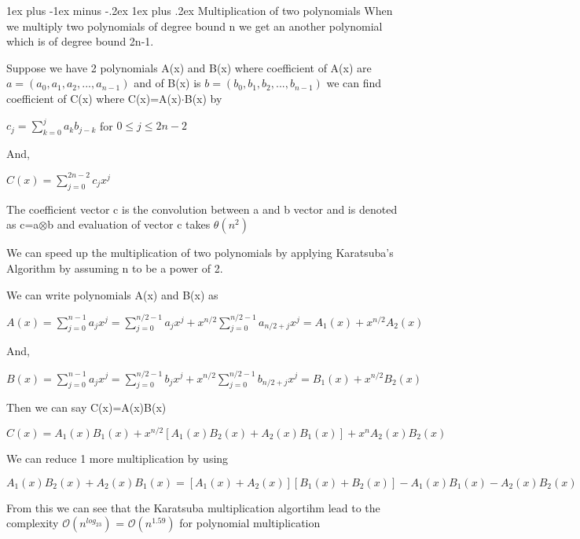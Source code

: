 \documentclass[11pt]{article}
\makeatletter
\renewcommand{\subsubsection}{\@startsection{subsubsection}{3}{0mm}%
                                     {1ex plus -1ex minus -.2ex}%
                                     {1ex plus .2ex}%
                                     {\normalfont\normalsize\bfseries}}
\newcommand{\Oh}[1]{{\mathcal O}\left({#1}\right)}
\makeatother
\begin{document}
\subsubsection{Multiplication of two polynomials}
When we multiply two polynomials of degree bound n we get an another polynomial which is of degree bound 2n-1.

Suppose we have 2 polynomials A(x) and B(x) where coefficient of A(x) are $a=(a_0,a_1,a_2,...,a_{n-1})$ and of B(x) is $b=(b_0,b_1,b_2,...,b_{n-1})$ we can find coefficient of C(x) where C(x)=A(x)$\cdot$B(x) by 

\begin{center}$c_j=\sum\limits_{k=0}^ja_kb_{j-k}$  for  $0\leq j\leq 2n-2$ \end{center}
And,
\begin{center}$C(x) = \sum\limits_{j=0}^{2n-2}c_jx^j$\end{center}


The coefficient vector c is the convolution between a and b vector and is denoted as c=a$\otimes$b and evaluation of vector c takes $\theta(n^2)$

We can speed up the multiplication of two polynomials by applying Karatsuba's Algorithm by assuming n to be a power of 2.

We can write polynomials A(x) and B(x) as

\begin{center} $A(x)=\sum\limits_{j=0}^{n-1}a_jx^j=\sum\limits_{j=0}^{n/2-1}a_jx^j+x^{n/2}\sum\limits_{j=0}^{n/2-1}a_{n/2+j}x^j=A_1(x)+x^{n/2}A_2(x)$\end{center}
And,
\begin{center} $B(x)=\sum\limits_{j=0}^{n-1}a_jx^j=\sum\limits_{j=0}^{n/2-1}b_jx
^j+x^{n/2}\sum\limits_{j=0}^{n/2-1}b_{n/2+j}x^j=B_1(x)+x^{n/2}B_2(x)$\end{center}

Then we can say C(x)=A(x)B(x)
\begin{center}$C(x)=A_1(x)B_1(x)+x^{n/2}[A_1(x)B_2(x)+A_2(x)B_1(x)]+x^nA_2(x)B_2(x)$\end{center}
We can reduce 1 more multiplication by using
\begin{center}$A_1(x)B_2(x)+A_2(x)B_1(x)=[A_1(x)+A_2(x)][B_1(x)+B_2(x)]-A_1(x)B_1(x)-A_2(x)B_2(x)$\end{center}

From this we can see that the Karatsuba multiplication algortihm lead to the complexity $\Oh {n^{log_23}}$ = $\Oh {n^{1.59}}$ for polynomial multiplication
\end{document}
